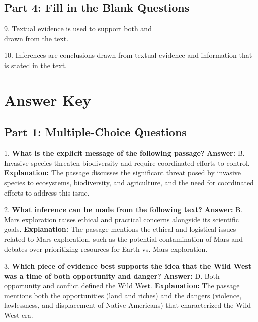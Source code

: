 \documentclass[12pt]{article}
\begin{document}
\vspace{4cm}

\subsection*{Part 4: Fill in the Blank Questions}
\vspace{1cm}
9. Textual evidence is used to support both \underline{\hspace{4cm}} and\\ \underline{\hspace{4cm}} drawn from the text.  
\vspace{1cm}

10. Inferences are conclusions drawn from textual evidence and information that\\ is \underline{\hspace{4cm}} stated in the text.  
\vspace{2cm}
\newpage
\section*{Answer Key}

\subsection*{Part 1: Multiple-Choice Questions}

1. \textbf{What is the explicit message of the following passage?}  
\textbf{Answer:} B. Invasive species threaten biodiversity and require coordinated efforts to control.  
\textbf{Explanation:} The passage discusses the significant threat posed by invasive species to ecosystems, biodiversity, and agriculture, and the need for coordinated efforts to address this issue.

\vspace{1cm}
2. \textbf{What inference can be made from the following text?}  
\textbf{Answer:} B. Mars exploration raises ethical and practical concerns alongside its scientific goals.  
\textbf{Explanation:} The passage mentions the ethical and logistical issues related to Mars exploration, such as the potential contamination of Mars and debates over prioritizing resources for Earth vs. Mars exploration.

\vspace{1cm}
3. \textbf{Which piece of evidence best supports the idea that the Wild West was a time of both opportunity and danger?}  
\textbf{Answer:} D. Both opportunity and conflict defined the Wild West.  
\textbf{Explanation:} The passage mentions both the opportunities (land and riches) and the dangers (violence, lawlessness, and displacement of Native Americans) that characterized the Wild West era.
\end{document}
